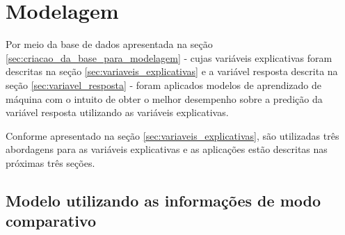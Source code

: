 \chapter{Modelagem}
\label{cap:modelagem}

Por meio da base de dados apresentada na seção \ref{sec:criacao_da_base_para_modelagem} - cujas variáveis explicativas foram descritas na seção \ref{sec:variaveis_explicativas} e a variável resposta descrita na seção \ref{sec:variavel_resposta} - foram aplicados modelos de aprendizado de máquina com o intuito de obter o melhor desempenho sobre a predição da variável resposta utilizando as variáveis explicativas.

Conforme apresentado na seção \ref{sec:variaveis_explicativas}, são utilizadas três abordagens para as variáveis explicativas e as aplicações estão descritas nas próximas três seções.

\section{Modelo utilizando as informações de modo comparativo}
\label{sec:modelo_utilizando_as_informações_de_modo_comparativo}





